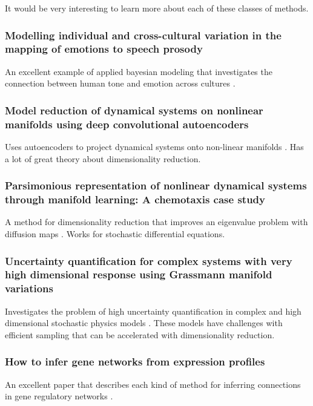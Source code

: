 \documentclass{article}
\begin{document}
        It would be very interesting to learn more about each of these classes of methods.

    \subsubsection*{Modelling individual and cross-cultural variation in the mapping of emotions to speech prosody}
        An excellent example of applied bayesian modeling that investigates the connection between human
        tone and emotion across cultures \cite{vanrijn2023modeling}.

    \subsubsection*{Model reduction of dynamical systems on nonlinear manifolds using deep convolutional autoencoders}
        Uses autoencoders to project dynamical systems onto non-linear manifolds \cite{lee2020model}.
        Has a lot of great theory about dimensionality reduction.

    \subsubsection*{Parsimonious representation of nonlinear dynamical systems through manifold learning: A chemotaxis case study}
        A method for dimensionality reduction that improves an eigenvalue problem with diffusion maps \cite{dsilva2018parsimonious}. Works for
        stochastic differential equations.

    \subsubsection*{Uncertainty quantification for complex systems with very high dimensional response using Grassmann manifold variations}
        Investigates the problem of high uncertainty quantification in complex and high dimensional stochastic physics
        models \cite{giovanis2018uncertainty}. These models have challenges with efficient sampling that can be accelerated with
        dimensionality reduction.

    \subsubsection*{How to infer gene networks from expression profiles}
        An excellent paper that describes each kind of method for inferring
        connections in gene regulatory networks \cite{bansal2007infer}.
\end{document}
